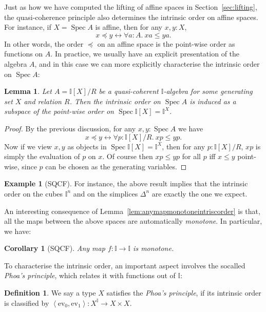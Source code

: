 \documentclass[12pt]{amsart}
\newtheorem{lemma}[theorem]{Lemma}
\newtheorem{corollary}[theorem]{Corollary}
\theoremstyle{definition}
\newtheorem{example}[theorem]{Example}
\newtheorem{definition}[theorem]{Definition}
\newcommand{\mbb}[1]{\mathbb{#1}}
\newcommand{\I}{\mbb I}
\newcommand{\pair}[1]{\left\langle#1\right\rangle}
\newcommand{\ev}{\mathrm{ev}}
\newcommand{\fa}[2]{\forall #1\!\colon\!\!#2.\ }
\newcommand{\eq}{\leftrightarrow}
\newcommand{\spec}{\operatorname{Spec}}
\begin{document}
Just as how we have computed the lifting of affine spaces in Section~\ref{sec:lifting}, the quasi-coherence principle also determines the intrinsic order on affine spaces. For instance, if $X = \spec A$ is affine, then for any $x,y : X$,
\[ x \preceq y \eq \fa aA xa \le ya. \]
In other words, the order $\preceq$ on an affine space is the point-wise order as functions on $A$. In practice, we usually have an explicit presentation of the algebra $A$, and in this case we can more explicitly characterise the intrinsic order on $\spec A$:

\begin{lemma}
  Let $A = \I[X]/R$ be a quasi-coherent $\I$-algebra for some generating set $X$ and relation $R$. Then the intrinsic order on $\spec A$ is induced as a subspace of the point-wise order on $\spec\I[X] = \I^X$.
\end{lemma}
\begin{proof}
  By the previous discussion, for any $x,y : \spec A$ we have
  \[ x \preceq y \eq \fa p{\I[X]/R} xp \le yp. \]
  Now if we view $x,y$ as objects in $\spec \I[X] = \I^X$, then for any $p : \I[X]/R$, $xp$ is simply the evaluation of $p$ on $x$. Of course then $xp \le yp$ for all $p$ iff $x \le y$ point-wise, since $p$ can be chosen as the generating variables.
\end{proof}

\begin{example}[SQCF]
  For instance, the above result implies that the intrinsic order on the cubes $\I^n$ and on the simplices $\Delta^n$ are exactly the one we expect.
\end{example}

An interesting consequence of Lemma~\ref{lem:anymapmonotoneintriscorder} is that, all the maps between the above spaces are automatically \emph{monotone}. In particular, we have:

\begin{corollary}[SQCF]\label{cor:syntheticorderinterval}
  Any map $f : \I \to \I$ is monotone.
\end{corollary}

To characterise the intrinsic order, an important aspect involves the socalled \emph{Phoa's principle}, which relates it with functions out of $\I$:

\begin{definition}
  We say a type $X$ satisfies the \emph{Phoa's principle}, if its intrinsic order is classified by $\pair{\ev_0,\ev_1} : X^\I \to X \times X$.
\end{definition}
\end{document}
